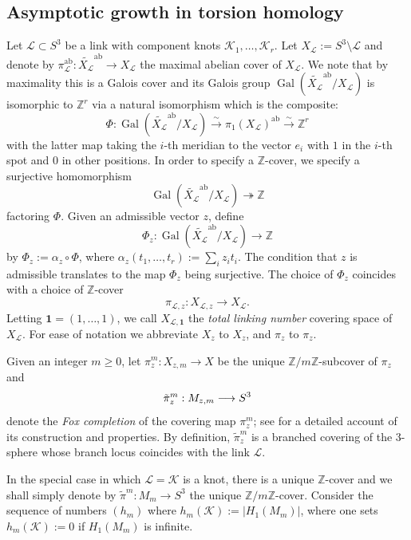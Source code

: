 \documentclass[table]{amsart}
\newcommand{\cK}{\mathcal{K}}
\newcommand{\Z}{\mathbb{Z}}
\newcommand{\cL}{\mathcal{L}}
\newcommand{\op}[1]{\operatorname{#1}}
\numberwithin{equation}{section}
\begin{document}
\subsection{Asymptotic growth in torsion homology}
\par Let $\cL\subset S^3$ be a link with component knots $\cK_1, \dots, \cK_r$. Let $X_{\cL}:=S^3\setminus \cL$ and denote by $\pi_{\cL}^{\op{ab}}:\widetilde{X_{\cL}}^{\op{ab}}\rightarrow X_{\cL}$ the maximal abelian cover of $X_{\cL}$. We note that by maximality this is a Galois cover and its Galois group $\op{Gal}(\widetilde{X_{\cL}}^{\op{ab}}/X_{\cL})$ is isomorphic to $\Z^r$ via a natural isomorphism which is the composite:
\[\Phi: \op{Gal}(\widetilde{X_{\cL}}^{\op{ab}}/X_{\cL})\xrightarrow{\sim} \pi_1(X_{\cL})^{\op{ab}}\xrightarrow{\sim} \Z^r\] with the latter map taking the $i$-th meridian to the vector $e_i$ with $1$ in the $i$-th spot and $0$ in other positions. In order to specify a $\Z$-cover, we specify a surjective homomorphism 
\[\op{Gal}(\widetilde{X_{\cL}}^{\op{ab}}/X_{\cL})\twoheadrightarrow \Z\]
factoring $\Phi$. Given an admissible vector $z$, define 
\[\Phi_z: \op{Gal}(\widetilde{X_{\cL}}^{\op{ab}}/X_{\cL})\rightarrow \Z\] by $\Phi_z:=\alpha_z\circ \Phi$, where $\alpha_z(t_1, \dots, t_r):=\sum_i z_i t_i$. The condition that $z$ is admissible translates to the map $\Phi_z$ being surjective. The choice of $\Phi_z$ coincides with a choice of $\Z$-cover 
\[\pi_{\cL, z}: X_{\cL, z}\rightarrow X_{\cL}.\]Letting $\mathbf{1}=(1,\dots, 1)$, we call $X_{\cL,\mathbf{1}}$ the \emph{total linking number} covering space of $X_{\cL}$. For ease of notation we abbreviate $X_z$ to $X_z$, and $\pi_z$ to $\pi_z$.

\par Given an integer $m\geq 0$, let $\pi_z^m: X_{z,m}\rightarrow X$ be the unique $\Z/m \Z$-subcover of $\pi_z$ and
\begin{equation}\label{M_{z,m} defn}
\tilde{\pi}_{z}^m : M_{z,m} \longrightarrow S^3
\end{equation}
denote the \emph{Fox completion} of the covering map \(\pi_{z}^m\); see \cite[§10.2]{morishita2011knots} for a detailed account of its construction and properties. By definition, \(\tilde{\pi}_{z}^m\) is a branched covering of the 3-sphere whose branch locus coincides with the link \(\cL\).

\par In the special case in which $\cL=\cK$ is a knot, there is a unique $\Z$-cover and we shall simply denote by $\tilde{\pi}^m: M_m\rightarrow S^3$ the unique $\Z/m\Z$-cover. Consider the sequence of numbers $(h_m)$ where $h_m(\cK):=|H_1(M_m)|$, where one sets $h_m(\cK):=0$ if $H_1(M_m)$ is infinite. 
\end{document}
